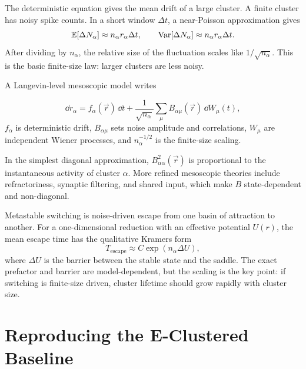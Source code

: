 The deterministic equation gives the mean drift of a large cluster. A finite cluster has noisy spike counts. In a short window $\Delta t$, a near-Poisson approximation gives
%
\begin{equation}
  \mathbb{E}[\Delta N_{\alpha}]
  \approx
  n_{\alpha}r_{\alpha}\Delta t,
  \qquad
  \operatorname{Var}[\Delta N_{\alpha}]
  \approx
  n_{\alpha}r_{\alpha}\Delta t .
  \label{eq:cluster-count-moments}
\end{equation}
%
After dividing by $n_{\alpha}$, the relative size of the fluctuation scales like $1/\sqrt{n_{\alpha}}$. This is the basic finite-size law: larger clusters are less noisy.

A Langevin-level mesoscopic model writes
%
\begin{keyequation}
\begin{equation}
  \dd r_{\alpha}
  =
  f_{\alpha}(\vec r)\,\dd t
  +
  \frac{1}{\sqrt{n_{\alpha}}}
  \sum_{\mu} B_{\alpha\mu}(\vec r)\,\dd W_{\mu}(t),
  \label{eq:cluster-langevin}
\end{equation}
\tcblower
$f_{\alpha}$ is deterministic drift, $B_{\alpha\mu}$ sets noise amplitude and correlations, $W_{\mu}$ are independent Wiener processes, and $n_{\alpha}^{-1/2}$ is the finite-size scaling.
\end{keyequation}

\noindent In the simplest diagonal approximation, $B_{\alpha\alpha}^2(\vec r)$ is proportional to the instantaneous activity of cluster $\alpha$. More refined mesoscopic theories include refractoriness, synaptic filtering, and shared input, which make $B$ state-dependent and non-diagonal.

Metastable switching is noise-driven escape from one basin of attraction to another. For a one-dimensional reduction with an effective potential $U(r)$, the mean escape time has the qualitative Kramers form
%
\begin{equation}
  T_{\mathrm{escape}}
  \approx
  C
  \exp\!\left(n_{\alpha}\Delta U\right),
  \label{eq:kramers-cluster-scaling}
\end{equation}
%
where $\Delta U$ is the barrier between the stable state and the saddle. The exact prefactor and barrier are model-dependent, but the scaling is the key point: if switching is finite-size driven, cluster lifetime should grow rapidly with cluster size.

\section{Reproducing the E-Clustered Baseline}
\label{sec:reproducing-e-clustered-baseline}

